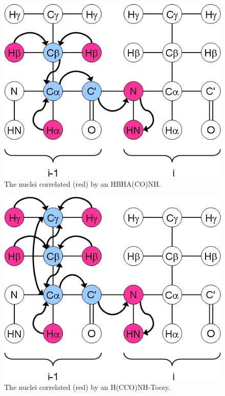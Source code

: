 \begin{figure}
  \includegraphics[scale=0.75]{figures/ccpn_hbhaconh}
  \caption[The nuclei correlated by an HBHA(CO)NH.]
          {The nuclei correlated (red) by an HBHA(CO)NH.}
  \label{ccpn_hbhaconh}
\end{figure}

\begin{figure}
  \includegraphics[scale=0.75]{figures/ccpn_hcconhtocsy}
  \caption[The nuclei correlated by an H(CCO)NH-Tocsy.]
          {The nuclei correlated (red) by an H(CCO)NH-Tocsy.}
  \label{ccpn_hcconhtocsy}
\end{figure}

